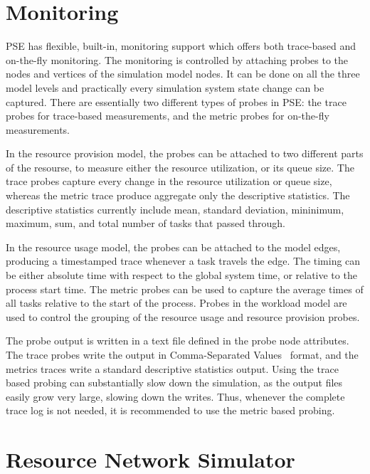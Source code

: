 \section{Monitoring}

PSE has flexible, built-in, monitoring support which offers both trace-based and on-the-fly monitoring. The monitoring is controlled by attaching probes to the nodes and vertices of the simulation model nodes. It can be done on all the three model levels and practically every simulation system state change can be captured. There are essentially two different types of probes in PSE: the trace probes for trace-based measurements, and the metric probes for on-the-fly measurements.

In the resource provision model, the probes can be attached to two different parts of the resourse, to measure either the resource utilization, or its queue size. The trace probes capture every change in the resource utilization or queue size, whereas the metric trace produce aggregate only the descriptive statistics. The descriptive statistics currently include mean, standard deviation, mininimum, maximum, sum, and total number of tasks that passed through.

In the resource usage model, the probes can be attached to the model edges, producing a timestamped trace whenever a task travels the edge. The timing can be either absolute time with respect to the global system time, or relative to the process start time. The metric probes can be used to capture the average times of all tasks relative to the start of the process. Probes in the workload model are used to control the grouping of the resource usage and resource provision probes.

The probe output is written in a text file defined in the probe node attributes. The trace probes write the output in Comma-Separated Values~\cite{https://tools.ietf.org/html/rfc4180} format, and the metrics traces write a standard descriptive statistics output. Using the trace based probing can substantially slow down the simulation, as the output files easily grow very large, slowing down the writes. Thus, whenever the complete trace log is not needed, it is recommended to use the metric based probing.


\section{Resource Network Simulator}
\label{sec:resource-network-simulator}

